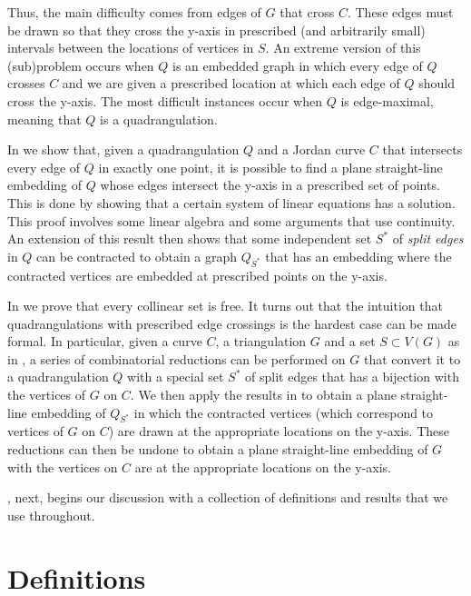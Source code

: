 \documentclass{patmorin}
\begin{document}
Thus, the main difficulty comes from edges of $G$ that cross $C$.
These edges must be drawn so that they cross the y-axis in prescribed
(and arbitrarily small) intervals between the locations of vertices
in $S$.  An extreme version of this (sub)problem occurs when $Q$ is an
embedded graph in which every edge of $Q$ crosses $C$ and we are given a
prescribed location at which each edge of $Q$ should cross the y-axis.
The most difficult instances occur when $Q$ is edge-maximal, meaning
that $Q$ is a quadrangulation.

In  we show that, given a quadrangulation $Q$
and a Jordan curve $C$ that intersects every edge of $Q$ in exactly
one point, it is possible to find a plane straight-line embedding of
$Q$ whose edges intersect the y-axis in a prescribed set of points.
This is done by showing that a certain system of linear equations has
a solution. This proof involves some linear algebra and some arguments
that use continuity.  An extension of this result then shows that some
independent set $S^*$ of \emph{split edges} in $Q$ can be contracted
to obtain a graph $Q_{S^*}$ that has an embedding where the contracted
vertices are embedded at prescribed points on the y-axis.

In  we prove that every collinear set is free.
It turns out that the intuition that quadrangulations with prescribed
edge crossings is the hardest case can be made formal. In particular,
given a curve $C$, a triangulation $G$ and a set $S\subset V(G)$ as
in , a series of combinatorial reductions can be
performed on $G$ that convert it to a quadrangulation $Q$ with a special
set $S^*$ of split edges that has a bijection with the vertices of $G$
on $C$.  We then apply the results in  to obtain
a plane straight-line embedding of $Q_{S^*}$ in which the contracted
vertices (which correspond to vertices of $G$ on $C$) are drawn at the
appropriate locations on the y-axis. These reductions can then be undone
to obtain a plane straight-line embedding of $G$ with the vertices on $C$
are at the appropriate locations on the y-axis.

, next, begins our discussion with a collection of
definitions and results that we use throughout.


\section{Definitions}
\end{document}
